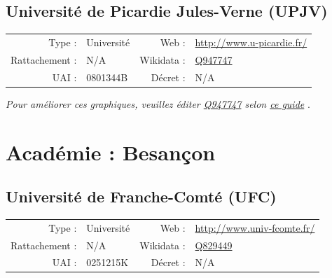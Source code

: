 \documentclass[11pt,french,landscape]{article}
\begin{document}
\hypertarget{universituxe9-de-picardie-jules-verne-upjv}{%
\subsection{Université de Picardie Jules-Verne
(UPJV)}\label{universituxe9-de-picardie-jules-verne-upjv}}

\begin{tabular*}{0.45\textwidth}{rp{2cm}rl}  
\hline  
Type : & Université & Web : &\href{http://www.u-picardie.fr/}{http://www.u-picardie.fr/} \\  
Rattachement : & N/A & Wikidata : & \href{https://www.wikidata.org/entity/Q947747}{Q947747} \\  
UAI : & 0801344B & Décret : & N/A \\  
\hline  
\end{tabular*}

\textit{\scriptsize Pour améliorer ces graphiques, veuillez éditer \href{https://www.wikidata.org/entity/Q947747}{Q947747}  selon \href{https://github.com/cpesr/wikidataESR/blob/master/Rmd/wikidataESR.md}{ce guide}}
.


\newpage

\hypertarget{acaduxe9mie-besanuxe7on}{%
\section{Académie : Besançon}\label{acaduxe9mie-besanuxe7on}}

\hypertarget{universituxe9-de-franche-comtuxe9-ufc}{%
\subsection{Université de Franche-Comté
(UFC)}\label{universituxe9-de-franche-comtuxe9-ufc}}

\begin{tabular*}{0.45\textwidth}{rp{2cm}rl}  
\hline  
Type : & Université & Web : &\href{http://www.univ-fcomte.fr/}{http://www.univ-fcomte.fr/} \\  
Rattachement : & N/A & Wikidata : & \href{https://www.wikidata.org/entity/Q829449}{Q829449} \\  
UAI : & 0251215K & Décret : & N/A \\  
\hline  
\end{tabular*}
\end{document}
